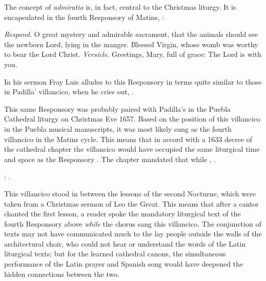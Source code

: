 The concept of \emph{admiratio} is, in fact, central to the Christmas liturgy.
It is encapsulated in the fourth Responsory of Matins, :
\begin{quoting}
    \emph{Respond}. O great mystery and admirable sacrament, that the animals
    should see the newborn Lord, lying in the manger.
    Blessed Virgin, whose womb was worthy to bear the Lord Christ.\newline
    \emph{Versicle}. Greetings, Mary, full of grace: The Lord is with you.%
        \Autocite 
        [175: .]
        {Catholic:Breviarium1631}
\end{quoting}
In his sermon Fray Luis alludes to this Responsory in terms quite similar to
those in Padilla' villancico, when he cries out, .%
    \Autocite
    [38: ]
    {LuisdeGranada:Xmas}

This same Responsory was probably paired with Padilla's  in the Puebla Cathedral liturgy on Christmas Eve 1657.
Based on the position of this villancico in the Puebla musical manuscripts, it
was most likely sung as the fourth villancico in the Matins cycle.
This means that in accord with a 1633 decree of the cathedral chapter the
villancico would have occupied the same liturgical time and space as the
Responsory .
The chapter mandated that while , .%
\begin{Footnote}
    :
    .
\end{Footnote}
This villancico stood in between the lessons of the second Nocturne, which were
taken from a Christmas sermon of Leo the Great.
This means that after a cantor chanted the first lesson, a reader spoke the
mandatory liturgical text of the fourth Responsory above \emph{while} the chorus
sang this villancico.
The conjunction of texts may not have communicated much to the lay people
outside the walls of the architectural choir, who could not hear or understand
the words of the Latin liturgical texts; but for the learned cathedral canons,
the simultaneous performance of the Latin prayer and Spanish song would have
deepened the hidden connections between the two.

